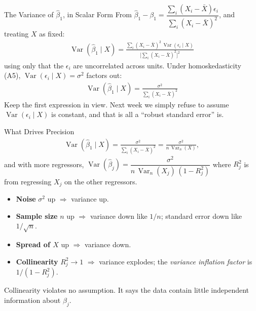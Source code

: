 \documentclass[aspectratio=169,11pt,xcolor=dvipsnames]{beamer}
\DeclareMathOperator{\Var}{Var}
\begin{document}
\begin{frame}{The Variance of $\hat\beta_1$, in Scalar Form}
From $\hat\beta_1 - \beta_1 = \dfrac{\sum_i (X_i - \bar X)\epsilon_i}{\sum_i (X_i-\bar X)^2}$,
and treating $X$ as fixed:
\begin{align*}
  \Var(\hat\beta_1\mid X)
  = \frac{\sum_i (X_i-\bar X)^2\,\Var(\epsilon_i\mid X)}
         {\big[\sum_i (X_i - \bar X)^2\big]^2}
\end{align*}
using only that the $\epsilon_i$ are uncorrelated across units.
\pause
\vskip4pt
Under homoskedasticity (A5), $\Var(\epsilon_i\mid X)=\sigma^2$ factors out:
\begin{align*}
  \boxed{\;\Var(\hat\beta_1\mid X) = \frac{\sigma^2}{\sum_i (X_i - \bar X)^2}\;}
\end{align*}
\alert{Keep the first expression in view.} Next week we simply refuse to assume
$\Var(\epsilon_i\mid X)$ is constant, and that is all a ``robust standard
error'' is.
\end{frame}

\begin{frame}{What Drives Precision}
\begin{align*}
  \Var(\hat\beta_1\mid X) = \frac{\sigma^2}{\sum_i (X_i - \bar X)^2}
  = \frac{\sigma^2}{n\,\Var_n(X)} ,
\end{align*}
and with more regressors,
$\Var(\hat\beta_j) = \dfrac{\sigma^2}{n\,\Var_n(X_j)\,(1-R_j^2)}$
where $R_j^2$ is from regressing $X_j$ on the other regressors.
\vskip2pt
\begin{itemize}\itemsep2pt
  \item \textbf{Noise} $\sigma^2$ up $\Rightarrow$ variance up.
  \item \textbf{Sample size} $n$ up $\Rightarrow$ variance down like $1/n$;
        standard error down like $1/\sqrt n$.
  \item \textbf{Spread of $X$} up $\Rightarrow$ variance down.
  \item \textbf{Collinearity} $R_j^2 \to 1$ $\Rightarrow$ variance explodes; the
        \emph{variance inflation factor} is $1/(1-R_j^2)$.
\end{itemize}
\vskip3pt
Collinearity violates no assumption. It says the data contain little independent
information about $\beta_j$.
\end{frame}
\end{document}
